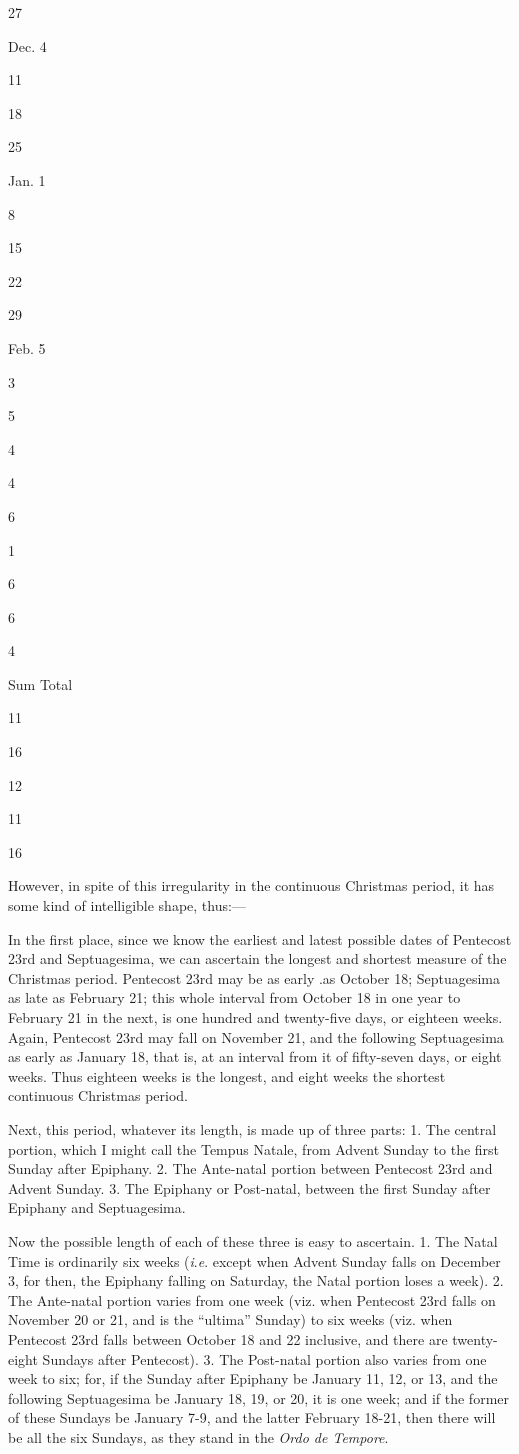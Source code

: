27

Dec. 4

11

18

25

Jan. 1

8

15

22

29

Feb. 5

3

5

4

4

6

1

6

6

4

Sum Total

11

16

12

11

16

However, in spite
of this irregularity in the continuous Christmas period, it has some
kind of intelligible shape, thus:—

In the first place, since we
know the earliest and latest possible dates of Pentecost 23rd and
Septuagesima, we can ascertain the longest and shortest measure of the
Christmas period. Pentecost 23rd may be as early .as October 18;
Septuagesima as late as February 21; this whole interval from October
18 in one year to February 21 in the next, is one hundred and
twenty-five days, or eighteen weeks. Again, Pentecost 23rd may fall on
November 21, and the following Septuagesima as early as January 18,
that is, at an interval from it of fifty-seven days, or eight weeks.
Thus eighteen weeks is the longest, and eight weeks the shortest
continuous Christmas period.

Next, this period, whatever
its length, is made up of three parts: 1. The central portion, which I
might call the Tempus Natale, from Advent Sunday to the first Sunday
after Epiphany. 2. The Ante-natal portion between Pentecost 23rd and
Advent Sunday. 3. The Epiphany or Post-natal, between the first Sunday
after Epiphany and Septuagesima.

Now the possible length of
each of these three is easy to ascertain. 1. The Natal Time is
ordinarily six weeks (\emph{i}.\emph{e}. except when Advent Sunday
falls on December 3, for then, the Epiphany falling on Saturday, the
Natal portion loses a week). 2. The Ante-natal portion varies from one
week (viz. when Pentecost 23rd falls on November 20 or 21, and is the ``ultima'' Sunday) to six weeks (viz. when Pentecost 23rd falls
between October 18 and 22
inclusive, and there are twenty-eight Sundays after Pentecost).
3. The Post-natal portion also varies from one week to six; for, if
the Sunday after Epiphany be January 11, 12, or 13, and the following
Septuagesima be January 18, 19, or 20, it is one week; and if the
former of these Sundays be January 7-9, and the latter February 18-21,
then there will be all the six Sundays, as they stand in the \emph{Ordo
de Tempore}.

